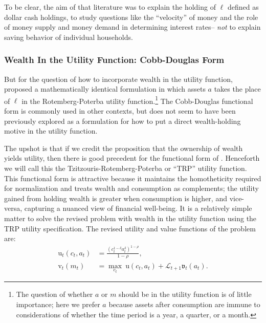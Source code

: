 \documentclass{article}
\newcommand{\CRRA}{\rho}
\newcommand{\uFunc}{\mathrm{u}}
\newcommand{\vFunc}{\mathrm{v}}
\newcommand{\Alive}{\mathcal{L}}
\newcommand{\cNrm}{c}
\newcommand{\mNrm}{m}
\newcommand{\aNrm}{a}
\newcommand{\lqdt}{\ell}
\begin{document}
To be clear, the aim of that literature was to explain the holding of $\lqdt$ defined as dollar cash holdings, to study questions like the ``velocity'' of money and the role of money supply and money demand in determining interest rates-- \textit{not} to explain saving behavior of individual households.

\subsubsection{Wealth In the Utility Function: Cobb-Douglas Form}

But for the question of how to incorporate wealth in the utility function, \cite{Tzitzouris2024} proposed a mathematically identical formulation in which assets $\aNrm$ takes the place of $\lqdt$ in the Rotemberg-Poterba utility function.\footnote{The question of whether $\aNrm$ or $\mNrm$ should be in the utility function is of little importance; here we prefer $\aNrm$ because assets after consumption are immune to considerations of whether the time period is a year, a quarter, or a month.}
The Cobb-Douglas functional form is commonly used in other contexts, but does not seem to have been previously explored as a formulation for how to put a direct wealth-holding motive in the utility function.


The upshot is that if we credit the proposition that the ownership of wealth yields utility, then there is good precedent for the functional form of \cite{Tzitzouris2024}.
Henceforth we will call this the Tzitzouris-Rotemberg-Poterba or ``TRP'' utility function. This functional form is attractive because it maintains the homotheticity required for normalization and treats wealth and consumption as complements; the utility gained from holding wealth is greater when consumption is higher, and vice-versa, capturing a nuanced view of financial well-being.
It is a relatively simple matter to solve the revised problem with wealth in the utility function using the TRP utility specification. The revised utility and value functions of the problem are:
\begin{align}
    \uFunc_t(\cNrm_t, \aNrm_t) & = \frac{\left(\cNrm_t^{1-\delta}\aNrm_t^{\delta}\right)^{1-\CRRA}}{1-\CRRA}, \\
    {\vFunc}_{t}({\mNrm}_{t}) & = \max_{\cNrm_{t}} ~ \uFunc(\cNrm_{t}, \aNrm_{t})+\Alive_{t+1}\mathfrak{v}_{t}(a_{t}).
\end{align}
\end{document}
